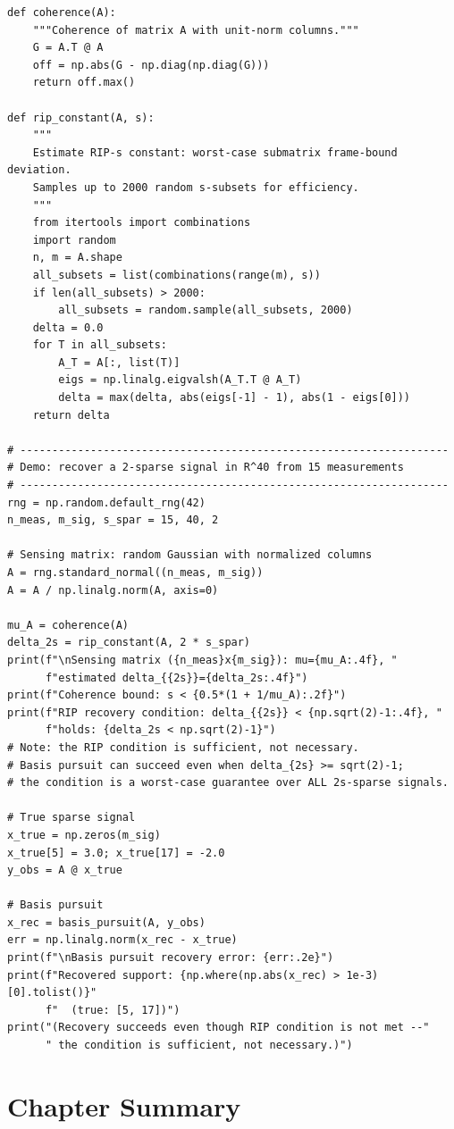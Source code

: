 \begin{lstlisting}[caption={Basis pursuit and compressed sensing in Python}]
def coherence(A):
    """Coherence of matrix A with unit-norm columns."""
    G = A.T @ A
    off = np.abs(G - np.diag(np.diag(G)))
    return off.max()

def rip_constant(A, s):
    """
    Estimate RIP-s constant: worst-case submatrix frame-bound deviation.
    Samples up to 2000 random s-subsets for efficiency.
    """
    from itertools import combinations
    import random
    n, m = A.shape
    all_subsets = list(combinations(range(m), s))
    if len(all_subsets) > 2000:
        all_subsets = random.sample(all_subsets, 2000)
    delta = 0.0
    for T in all_subsets:
        A_T = A[:, list(T)]
        eigs = np.linalg.eigvalsh(A_T.T @ A_T)
        delta = max(delta, abs(eigs[-1] - 1), abs(1 - eigs[0]))
    return delta

# -------------------------------------------------------------------
# Demo: recover a 2-sparse signal in R^40 from 15 measurements
# -------------------------------------------------------------------
rng = np.random.default_rng(42)
n_meas, m_sig, s_spar = 15, 40, 2

# Sensing matrix: random Gaussian with normalized columns
A = rng.standard_normal((n_meas, m_sig))
A = A / np.linalg.norm(A, axis=0)

mu_A = coherence(A)
delta_2s = rip_constant(A, 2 * s_spar)
print(f"\nSensing matrix ({n_meas}x{m_sig}): mu={mu_A:.4f}, "
      f"estimated delta_{{2s}}={delta_2s:.4f}")
print(f"Coherence bound: s < {0.5*(1 + 1/mu_A):.2f}")
print(f"RIP recovery condition: delta_{{2s}} < {np.sqrt(2)-1:.4f}, "
      f"holds: {delta_2s < np.sqrt(2)-1}")
# Note: the RIP condition is sufficient, not necessary.
# Basis pursuit can succeed even when delta_{2s} >= sqrt(2)-1;
# the condition is a worst-case guarantee over ALL 2s-sparse signals.

# True sparse signal
x_true = np.zeros(m_sig)
x_true[5] = 3.0; x_true[17] = -2.0
y_obs = A @ x_true

# Basis pursuit
x_rec = basis_pursuit(A, y_obs)
err = np.linalg.norm(x_rec - x_true)
print(f"\nBasis pursuit recovery error: {err:.2e}")
print(f"Recovered support: {np.where(np.abs(x_rec) > 1e-3)[0].tolist()}"
      f"  (true: [5, 17])")
print("(Recovery succeeds even though RIP condition is not met --"
      " the condition is sufficient, not necessary.)")
\end{lstlisting}

\section{Chapter Summary}
\label{sec:summary-ch12}

